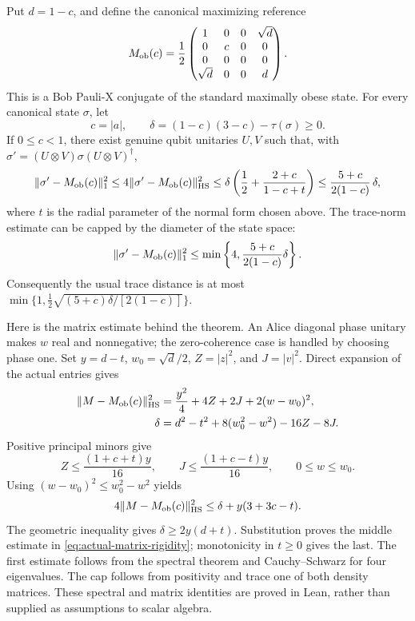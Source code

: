 Put \(d=1-c\), and define the canonical maximizing reference
\begin{equation}
 M_{\rm ob}(c)=\frac12
 \begin{pmatrix}
 1&0&0&\sqrt d\\
 0&c&0&0\\
 0&0&0&0\\
 \sqrt d&0&0&d
 \end{pmatrix}.
 \label{eq:aligned-obese}
\end{equation}
This is a Bob Pauli-X conjugate of the standard maximally obese state.
For every canonical state \(\sigma\), let
\[
 c=|a|,\qquad
 \delta=(1-c)(3-c)-\tau(\sigma)\geq0.
\]
If \(0\leq c<1\), there exist genuine qubit unitaries \(U,V\) such that,
with \(\sigma'=(U\otimes V)\sigma(U\otimes V)^\dagger\),
\begin{equation}
 \|\sigma'-M_{\rm ob}(c)\|_1^2
 \leq4\|\sigma'-M_{\rm ob}(c)\|_{\rm HS}^2
 \leq \delta\left(\frac12+\frac{2+c}{1-c+t}\right)
 \leq\frac{5+c}{2(1-c)}\,\delta,
 \label{eq:actual-matrix-rigidity}
\end{equation}
where \(t\) is the radial parameter of the normal form chosen above.
The trace-norm estimate can be capped by the diameter of the state space:
\begin{equation}
 \|\sigma'-M_{\rm ob}(c)\|_1^2
 \leq \min\left\{4,\frac{5+c}{2(1-c)}\delta\right\}.
 \label{eq:capped-matrix-rigidity}
\end{equation}
Consequently the usual trace distance is at most
\(\min\{1,\frac12\sqrt{(5+c)\delta/[2(1-c)]}\}\).

Here is the matrix estimate behind the theorem.  An Alice diagonal phase
unitary makes \(w\) real and nonnegative; the zero-coherence case is
handled by choosing phase one.  Set \(y=d-t\), \(w_0=\sqrt d/2\),
\(Z=|z|^2\), and \(J=|v|^2\).  Direct expansion of the actual entries gives
\begin{align}
 \|M-M_{\rm ob}(c)\|_{\rm HS}^2
   &=\frac{y^2}{4}+4Z+2J+2(w-w_0)^2,\\
 \delta&=d^2-t^2+8(w_0^2-w^2)-16Z-8J.
\end{align}
Positive principal minors give
\[
 Z\leq\frac{(1+c+t)y}{16},\qquad
 J\leq\frac{(1+c-t)y}{16},\qquad
 0\leq w\leq w_0.
\]
Using \((w-w_0)^2\leq w_0^2-w^2\) yields
\[
 4\|M-M_{\rm ob}(c)\|_{\rm HS}^2
 \leq\delta+y(3+3c-t).
\]
The geometric inequality gives
\(\delta\geq2y(d+t)\).  Substitution proves the middle estimate in
\eqref{eq:actual-matrix-rigidity}; monotonicity in \(t\geq0\) gives the last.
The first estimate follows from the spectral theorem and Cauchy--Schwarz
for four eigenvalues.  The cap follows from positivity and trace one of
both density matrices.  These spectral and matrix identities are proved
in Lean, rather than supplied as assumptions to scalar algebra.


